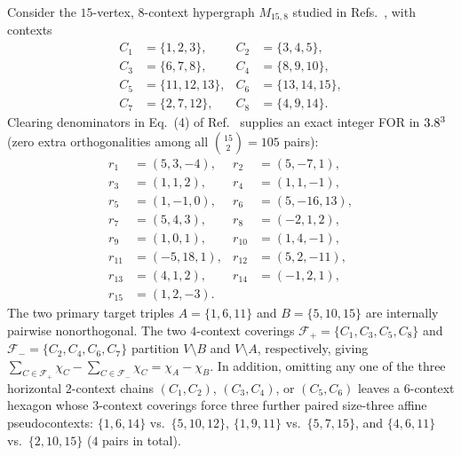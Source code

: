 \documentclass[aps,pra,reprint,superscriptaddress,longbibliography,nofootinbib,floatfix,10pt]{revtex4-2}
\theoremstyle{definition}\newtheorem{definition}[theorem]{Definition}
\theoremstyle{remark}\newtheorem{remark}[theorem]{Remark}
\begin{document}
Consider the $15$-vertex, $8$-context hypergraph $M_{15,8}$ studied in Refs.~\cite{Navara_1995,Mayet_2000,2023-navara-svozil,2026-Navara-Svozil-pseudocontexts}, with contexts
\begin{equation}\label{eq:M15-contexts}
\begin{aligned}
C_1&=\{1,2,3\},& C_2&=\{3,4,5\},\\
C_3&=\{6,7,8\},& C_4&=\{8,9,10\},\\
C_5&=\{11,12,13\},& C_6&=\{13,14,15\},\\
C_7&=\{2,7,12\},& C_8&=\{4,9,14\}.
\end{aligned}
\end{equation}
Clearing denominators in Eq.~(4) of Ref.~\cite{2023-navara-svozil} supplies an exact integer FOR in $3.8^3$ (zero extra orthogonalities among all $\binom{15}{2}=105$ pairs):
\begin{equation}\label{eq:M15-vectors}
\begin{aligned}
r_1&=(5,3,-4),& r_2&=(5,-7,1),\\
r_3&=(1,1,2),& r_4&=(1,1,-1),\\
r_5&=(1,-1,0),& r_6&=(5,-16,13),\\
r_7&=(5,4,3),& r_8&=(-2,1,2),\\
r_9&=(1,0,1),& r_{10}&=(1,4,-1),\\
r_{11}&=(-5,18,1),& r_{12}&=(5,2,-11),\\
r_{13}&=(4,1,2),& r_{14}&=(-1,2,1),\\
r_{15}&=(1,2,-3).&&
\end{aligned}
\end{equation}
The two primary target triples $A=\{1,6,11\}$ and $B=\{5,10,15\}$ are internally pairwise nonorthogonal. The two $4$-context coverings $\mathcal{F}_+=\{C_1,C_3,C_5,C_8\}$ and $\mathcal{F}_-=\{C_2,C_4,C_6,C_7\}$ partition $V\setminus B$ and $V\setminus A$, respectively, giving $\sum_{C\in\mathcal{F}_+}\chi_C-\sum_{C\in\mathcal{F}_-}\chi_C=\chi_A-\chi_B$. In addition, omitting any one of the three horizontal $2$-context chains $(C_1,C_2)$, $(C_3,C_4)$, or $(C_5,C_6)$ leaves a $6$-context hexagon whose $3$-context coverings force three further paired size-three affine pseudocontexts: $\{1,6,14\}$ vs.\ $\{5,10,12\}$, $\{1,9,11\}$ vs.\ $\{5,7,15\}$, and $\{4,6,11\}$ vs.\ $\{2,10,15\}$ ($4$ pairs in total).
\end{document}

